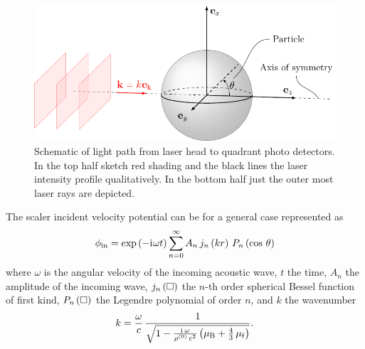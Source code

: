 \begin{figure}[tbp]
  \centering
  \includegraphics[]{Plots/cache/plane_wave.pdf}
  \caption{Schematic of light path from laser head to quadrant photo detectors. 
  In the top half sketch red shading and the black lines the laser intensity 
profile qualitatively. In the bottom half just the outer most laser rays are 
depicted.}
  \label{fig:TA-plane_wave}
\end{figure}

The scaler incident velocity potential can be for a general case represented as
\begin{equation}
  \phi_{\mathrm{in}} = \exp\left( -\mathrm{i}\mkern1mu\omega t \right) \sum\limits_{n=0}^{\infty} 
  A_{n}\,j_{n}\left(kr\right)\,P_{n}\left(\cos\,\theta\right)
  \label{eq:TA-incident-field}
\end{equation}
where $\omega$ is the angular velocity of the incoming acoustic wave, $t$ the 
time, $A_{n}$ the amplitude of the incoming wave, $j_{n}\left(\Box\right)$ the $n$-th 
order spherical Bessel function of first kind, $P_{n}\left(\Box\right)$ the 
Legendre polynomial of order $n$, and $k$ the wavenumber
\begin{equation}
  k = 
  \frac{\omega}{c}\,\frac{1}{\sqrt{1-\frac{\mathrm{i}\mkern1mu\,\omega}{\rho^{(0)}\,c^{2}} 
  \left( \mu_{\mathrm{B}} + \frac{4}{3}\,\mu_{\mathrm{f}} \right)}}.
  \label{eq:TA-wavenumber}
\end{equation}

